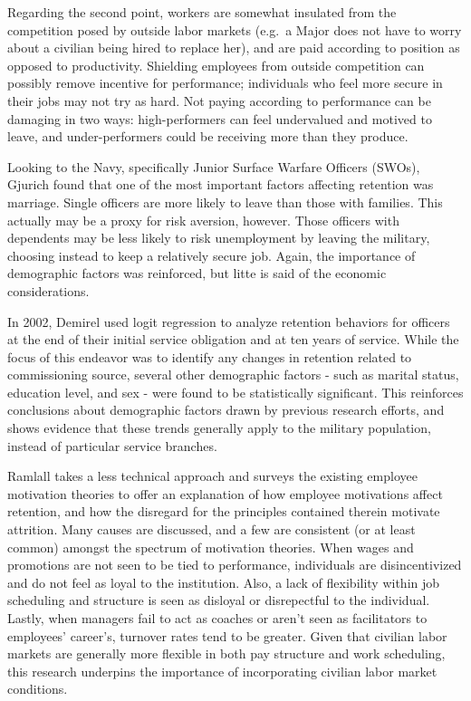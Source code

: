 \documentclass[12pt,letterpaper,toc=flat,oneside]{report}
\theoremstyle{definition}
\theoremstyle{definition}
\theoremstyle{definition}
\theoremstyle{remark}
\begin{document}
Regarding the second point, workers are somewhat insulated from the
competition posed by outside labor markets (e.g.~a Major does not have
to worry about a civilian being hired to replace her), and are paid
according to position as opposed to productivity. Shielding employees
from outside competition can possibly remove incentive for performance;
individuals who feel more secure in their jobs may not try as hard. Not
paying according to performance can be damaging in two ways:
high-performers can feel undervalued and motived to leave, and
under-performers could be receiving more than they produce.

Looking to the Navy, specifically Junior Surface Warfare Officers
(SWOs), Gjurich \cite{gjurich-1999} found that one of the most important
factors affecting retention was marriage. Single officers are more
likely to leave than those with families. This actually may be a proxy
for risk aversion, however. Those officers with dependents may be less
likely to risk unemployment by leaving the military, choosing instead to
keep a relatively secure job. Again, the importance of demographic
factors was reinforced, but litte is said of the economic
considerations.

In 2002, Demirel \cite{demirel-2002} used logit regression to analyze
retention behaviors for officers at the end of their initial service
obligation and at ten years of service. While the focus of this endeavor
was to identify any changes in retention related to commissioning
source, several other demographic factors - such as marital status,
education level, and sex - were found to be statistically significant.
This reinforces conclusions about demographic factors drawn by previous
research efforts, and shows evidence that these trends generally apply
to the military population, instead of particular service branches.

Ramlall \cite{ramlall-2004} takes a less technical approach and surveys
the existing employee motivation theories to offer an explanation of how
employee motivations affect retention, and how the disregard for the
principles contained therein motivate attrition. Many causes are
discussed, and a few are consistent (or at least common) amongst the
spectrum of motivation theories. When wages and promotions are not seen
to be tied to performance, individuals are disincentivized and do not
feel as loyal to the institution. Also, a lack of flexibility within job
scheduling and structure is seen as disloyal or disrepectful to the
individual. Lastly, when managers fail to act as coaches or aren't seen
as facilitators to employees' career's, turnover rates tend to be
greater. Given that civilian labor markets are generally more flexible
in both pay structure and work scheduling, this research underpins the
importance of incorporating civilian labor market conditions.
\end{document}
